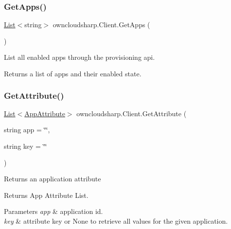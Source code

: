 \subsubsection{\texorpdfstring{Get\+Apps()}{GetApps()}}
{\footnotesize\ttfamily \hyperlink{classowncloudsharp_1_1_client_a914c144ebbe207958829523f7eda3609}{List}$<$string$>$ owncloudsharp.\+Client.\+Get\+Apps (\begin{DoxyParamCaption}{ }\end{DoxyParamCaption})}



List all enabled apps through the provisioning api. 

\begin{DoxyReturn}{Returns}
a list of apps and their enabled state.
\end{DoxyReturn}
\mbox{\label{classowncloudsharp_1_1_client_a8f843f60b178973e988c0edabef26c49}} 
\subsubsection{\texorpdfstring{Get\+Attribute()}{GetAttribute()}}
{\footnotesize\ttfamily \hyperlink{classowncloudsharp_1_1_client_a914c144ebbe207958829523f7eda3609}{List}$<$\hyperlink{classowncloudsharp_1_1_types_1_1_app_attribute}{App\+Attribute}$>$ owncloudsharp.\+Client.\+Get\+Attribute (\begin{DoxyParamCaption}\item[{string}]{app = {\ttfamily \char`\"{}\char`\"{}},  }\item[{string}]{key = {\ttfamily \char`\"{}\char`\"{}} }\end{DoxyParamCaption})}



Returns an application attribute 

\begin{DoxyReturn}{Returns}
App Attribute List.
\end{DoxyReturn}

\begin{DoxyParams}{Parameters}
{\em app} & application id.\\
\hline
{\em key} & attribute key or None to retrieve all values for the given application.\\
\hline
\end{DoxyParams}
\mbox{\label{classowncloudsharp_1_1_client_a6c228561d4c74c310b898ad8bd60095b}} 
